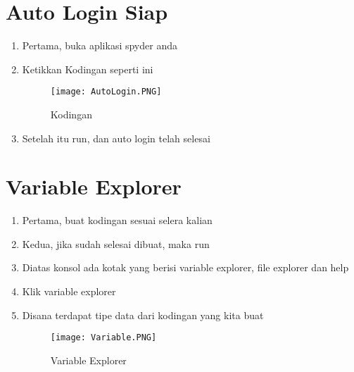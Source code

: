 \documentclass{article}
\begin{document}
\newpage
\section{Auto Login Siap}
\begin{enumerate}
    \item Pertama, buka aplikasi spyder anda
    \item Ketikkan Kodingan seperti ini
\begin{figure}
    \centering
    \texttt{[image: AutoLogin.PNG]}
    \caption{Kodingan}
\end{figure}
    \item Setelah itu run, dan auto login telah selesai
\end{enumerate}

\newpage
\section{Variable Explorer}
\begin{enumerate}
    \item Pertama, buat kodingan sesuai selera kalian
    \item Kedua, jika sudah selesai dibuat, maka run
    \item Diatas konsol ada kotak yang berisi variable explorer, file explorer dan help
    \item Klik variable explorer
    \item Disana terdapat tipe data dari kodingan yang kita buat
\begin{figure}
    \centering
    \texttt{[image: Variable.PNG]}
    \caption{Variable Explorer}
\end{figure}
\end{enumerate}
\end{document}
